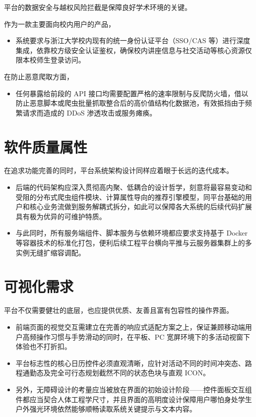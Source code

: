 \documentclass[UTF8,a4paper,12pt,fontset=none]{ctexrep}
\begin{document}
平台的数据安全与越权风险拦截是保障良好学术环境的关键。

作为一款主要面向校内用户的产品，

\begin{itemize}[leftmargin=2.5em]
\item 系统要求与浙江大学校内现有的统一身份认证平台（SSO/CAS 等）进行深度集成，依靠校方级安全认证鉴权，确保校内讲座信息与社交活动等核心资源仅限本校师生登录访问。
\end{itemize}

在防止恶意爬取方面，

\begin{itemize}[leftmargin=2.5em]
\item 任何暴露给前段的 API 接口均需要配置严格的速率限制与反爬防火墙，借以防止恶意脚本或爬虫批量抓取整合后的高价值结构化数据池，有效抵挡由于频繁请求而造成的 DDoS 渗透攻击或服务瘫痪。
\end{itemize}

\section{软件质量属性}

在追求功能完善的同时，平台系统架构设计同样应着眼于长远的迭代成本。

\begin{itemize}[leftmargin=2.5em]
\item 后端的代码架构应深入贯彻高内聚、低耦合的设计哲学，刻意将最容易变动和受阻的分布式爬虫组件模块、计算属性导向的推荐引擎模型，同平台基础的用户和核心业务流做到服务解耦式拆分，如此可以保障各大系统的后续代码扩展具有极为优异的可维护特质。
\end{itemize}

\begin{itemize}[leftmargin=2.5em]
\item 与此同时，所有服务端组件、脚本服务与依赖环境都应要求支持基于 Docker 等容器技术的标准化打包，便利后续工程平台横向平推与云服务器集群上的多实例无缝扩缩容调配。
\end{itemize}

\section{可视化需求}

平台不仅需要健壮的底层，也应提供优质、友善且富有包容性的操作界面。

\begin{itemize}[leftmargin=2.5em]
\item 前端页面的视觉交互需建立在完善的响应式适配方案之上，保证兼顾移动端用户高频操作习惯与手势滑动的同时，在平板、PC 宽屏环境下的多活动视窗下体验也不打折扣。
\item 平台标志性的核心日历控件必须直观清晰，应针对活动不同的时间冲突态、路程通勤态及完全可行态规划截然不同的状态色块与直观 ICON。
\item 另外，无障碍设计的考量应当被放在界面的初始设计阶段——控件面板交互组件都应当契合人体工程学尺寸，并且界面的高明度设计保障用户哪怕身处学生户外强光环境依然能够顺畅读取系统关键提示与文本内容。
\end{itemize}
\end{document}
